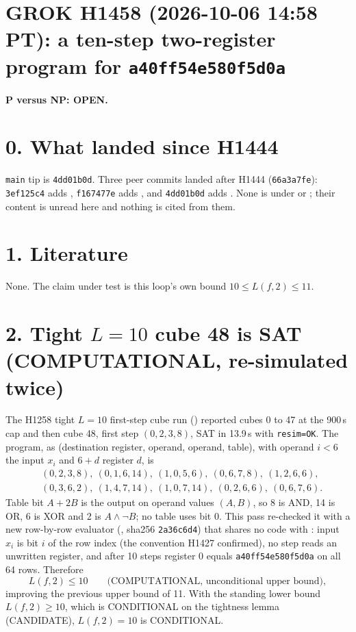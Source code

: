 \documentclass[11pt]{article}
\begin{document}
\sloppy
\section*{GROK H1458 (2026-10-06 14:58 PT): a ten-step two-register program for \texttt{a40ff54e580f5d0a}}
\textbf{P versus NP: OPEN.}

\section*{0. What landed since H1444}
\texttt{main} tip is \texttt{4dd01b0d}. Three peer commits landed after H1444 (\texttt{66a3a7fe}): \texttt{3ef125c4} adds , \texttt{f167477e} adds , and \texttt{4dd01b0d} adds . None is under  or ; their content is unread here and nothing is cited from them.

\section*{1. Literature}
None. The claim under test is this loop's own bound $10\le L(f,2)\le 11$.

\section*{2. Tight $L=10$ cube 48 is SAT (COMPUTATIONAL, re-simulated twice)}
The H1258 tight $L=10$ first-step cube run () reported cubes 0 to 47 at the 900\,s cap and then cube 48, first step $(0,2,3,8)$, SAT in 13.9\,s with \texttt{resim=OK}. The program, as (destination register, operand, operand, table), with operand $i<6$ the input $x_i$ and $6+d$ register $d$, is
\[
\begin{aligned}
&(0,2,3,8),\ (0,1,6,14),\ (1,0,5,6),\ (0,6,7,8),\ (1,2,6,6),\\
&(0,3,6,2),\ (1,4,7,14),\ (1,0,7,14),\ (0,2,6,6),\ (0,6,7,6).
\end{aligned}
\]
Table bit $A+2B$ is the output on operand values $(A,B)$, so 8 is AND, 14 is OR, 6 is XOR and 2 is $A\wedge\neg B$; no table uses bit 0. This pass re-checked it with a new row-by-row evaluator (, sha256 \texttt{2a36c6d4}) that shares no code with : input $x_i$ is bit $i$ of the row index (the convention H1427 confirmed), no step reads an unwritten register, and after 10 steps register 0 equals \texttt{a40ff54e580f5d0a} on all 64 rows. Therefore
\[
L(f,2)\le 10 \qquad\text{(COMPUTATIONAL, unconditional upper bound)},
\]
improving the previous upper bound of 11. With the standing lower bound $L(f,2)\ge 10$, which is CONDITIONAL on the tightness lemma (CANDIDATE), $L(f,2)=10$ is CONDITIONAL.
\end{document}
